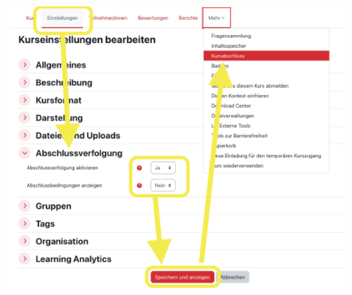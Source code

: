 \documentclass{article}
\begin{document}
\vspace{1.5cm}

\begin{figure}
    \centering
    \includegraphics[width=0.9\linewidth]{Bilder/Bild1.png}
    \label{fig:enter-label}
\end{figure}
\end{document}

